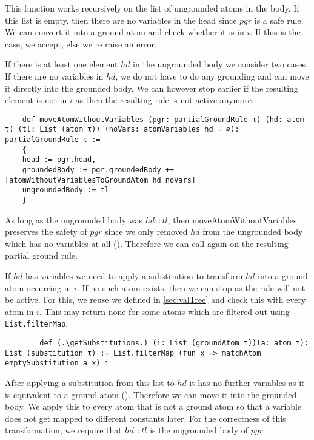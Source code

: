    This function works recursively on the list of ungrounded atoms in the body. If this list is empty, then there are no variables in the head since $pgr$ is a safe rule. We can convert it into a ground atom and check whether it is in $i$. If this is the case, we accept, else we re raise an error.

    If there is at least one element $hd$ in the ungrounded body we consider two cases. If there are no variables in $hd$, we do not have to do any grounding and can move it directly into the grounded body. We can however stop earlier if the resulting element is not in $i$ as then the resulting rule is not active anymore.

    \begin{lstlisting}
    def moveAtomWithoutVariables (pgr: partialGroundRule τ) (hd: atom τ) (tl: List (atom τ)) (noVars: atomVariables hd = ∅): partialGroundRule τ :=
    {
    head := pgr.head,
    groundedBody := pgr.groundedBody ++ [atomWithoutVariablesToGroundAtom hd noVars]
    ungroundedBody := tl
    }
    \end{lstlisting}

    As long as the ungrounded body was $hd::tl$, then moveAtomWithoutVariables preserves the safety of $pgr$ since we only removed $hd$ from the ungrounded body which has no variables at all (\moveAtomWithoutVariablesPreservesSafety). Therefore we can call \exploreGrounding again on the resulting partial ground rule.

    If $hd$ has variables we need to apply a substitution to transform $hd$ into a ground atom occurring in $i$. If no such atom exists, then we can stop as the rule will not be active. For this, we reuse \matchAtom we defined in \cref{sec:valTree} and check this with every atom in $i$. This may return none for some atoms which are filtered out using \lstinline|List.filterMap|.

    \begin{lstlisting}
        def (.\getSubstitutions.) (i: List (groundAtom τ))(a: atom τ): List (substitution τ) := List.filterMap (fun x => matchAtom emptySubstitution a x) i
    \end{lstlisting}

    After applying a substitution from this list to $hd$ it has no further variables as it is equivalent to a ground atom (\inGetSubstitutionsImplNoVars). Therefore we can move it into the grounded body. We apply this to every atom that is not a ground atom so that a variable does not get mapped to different constants later. For the correctness of this transformation, we require that $hd::tl$ is the ungrounded body of $pgr$.

